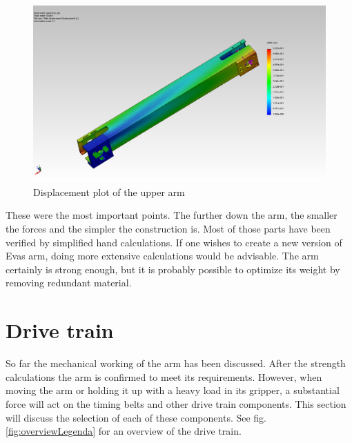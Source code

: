 \documentclass[technical_document.tex]{subfiles}
\begin{document}
\begin{figure}[ht!]
	\centering
	\mbox{\includegraphics[scale=0.3]{Images/upperArm_bar_displace.jpg}}
	\caption{Displacement plot of the upper arm}
	\label{fig:upperArm_displace}
\end{figure}

These were the most important points. The further down the arm, the smaller the forces and the simpler the construction is. Most of those parts have been verified by simplified hand calculations. If one wishes to create a new version of Eva\textquotesingle{}s arm, doing more extensive calculations would be advisable. The arm certainly is strong enough, but it is probably possible to optimize its weight by removing redundant material.


\section{Drive train}

So far the mechanical working of the arm has been discussed. After the strength calculations the arm is confirmed to meet its requirements. However, when moving the arm or holding it up with a heavy load in its gripper, a substantial force will act on the timing belts and other drive train components. This section will discuss the selection of each of these components. See fig. \ref{fig:overviewLegenda} for an overview of the drive train.
\end{document}
